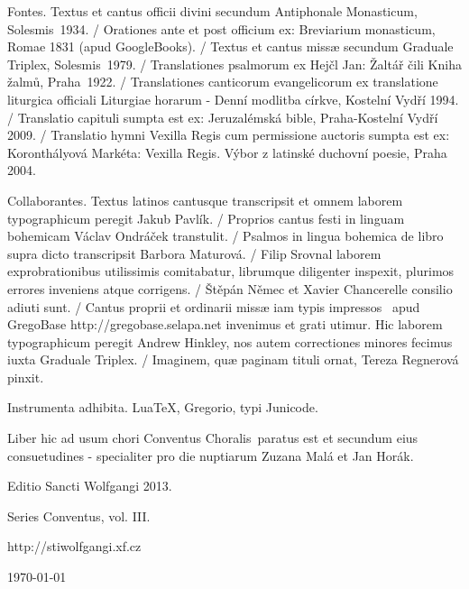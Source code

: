 \documentclass[a4paper, twoside, 12pt]{article}
\newcommand{\annusEditionis}{2013}
\begin{document}


\vfill

\pagebreak

\pagestyle{empty}

\tableofcontents

\vspace{3cm}

Fontes. 
Textus et cantus officii divini secundum Antiphonale Monasticum, Solesmis~1934. /
Orationes ante et post officium ex: 
Breviarium monasticum, Romae 1831 (apud GoogleBooks). /
Textus et cantus missæ secundum Graduale Triplex, Solesmis~1979. /
Translationes psalmorum ex Hejčl Jan: Žaltář čili Kniha žalmů, Praha~1922. /
Translationes canticorum evangelicorum ex translatione liturgica officiali
Liturgiae horarum - Denní modlitba církve, Kostelní Vydří 1994. /
Translatio capituli sumpta est ex: 
Jeruzalémská bible, Praha-Kostelní Vydří 2009. /
Translatio hymni Vexilla Regis cum permissione auctoris sumpta est ex:
Koronthályová Markéta: Vexilla Regis. Výbor z latinské duchovní poesie,
Praha 2004. 

Collaborantes.
Textus latinos cantusque transcripsit et omnem laborem typographicum peregit
Jakub Pavlík. /
Proprios cantus festi in linguam bohemicam Václav Ondráček transtulit. /
Psalmos in lingua bohemica de libro supra dicto transcripsit
Barbora Maturová. /
Filip Srovnal laborem exprobrationibus utilissimis comitabatur,
librumque diligenter inspexit, plurimos errores inveniens atque corrigens. /
Štěpán Němec et Xavier Chancerelle consilio adiuti sunt. /
Cantus proprii et ordinarii missæ 
iam \guillemotright typis impressos\guillemotleft\mbox{ }
apud GregoBase
http://gregobase.selapa.net invenimus et grati utimur. Hic laborem typographicum
peregit Andrew Hinkley, nos autem correctiones minores fecimus
iuxta Graduale Triplex. /
Imaginem, quæ paginam tituli ornat, Tereza Regnerová pinxit.

Instrumenta adhibita.
LuaTeX, %
Gregorio, %
typi Junicode. %

\begin{center}
Liber hic ad usum chori 
\guillemotright Conventus Choralis\guillemotleft\ 
paratus est
et secundum eius consuetudines -
specialiter pro die nuptiarum Zuzana Malá et Jan Horák.

\vspace{1cm}

{\large Editio Sancti Wolfgangi \annusEditionis .}

\vspace{2mm}

Series \guillemotright Conventus\guillemotleft, vol. III.

\vspace{1cm}

http://stiwolfgangi.xf.cz
\vfill

\today

\end{center}
\end{document}
